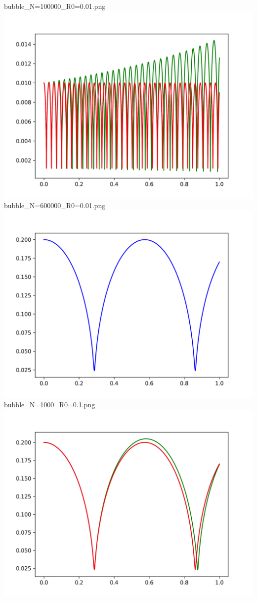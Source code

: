 \documentclass[a4paper,14pt]{article}
\begin{document}
bubble\_N=100000\_R0=0.01.png\newline
\includegraphics[scale=0.5]{images/graphs/bubble_N=600000_R0=0.01.png}\newline
bubble\_N=600000\_R0=0.01.png\newline
%
\includegraphics[scale=0.5]{images/graphs/bubble_N=1000_R0=0.2.png}\newline
bubble\_N=1000\_R0=0.1.png\newline
\includegraphics[scale=0.5]{images/graphs/bubble_N=10000_R0=0.2.png}\newline
\end{document}
